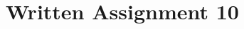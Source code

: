 \documentclass[]{svmono}
\begin{document}
\chapter{Written Assignment 10}

\noindent







%
%


\nocite{*}

















\end{document}

